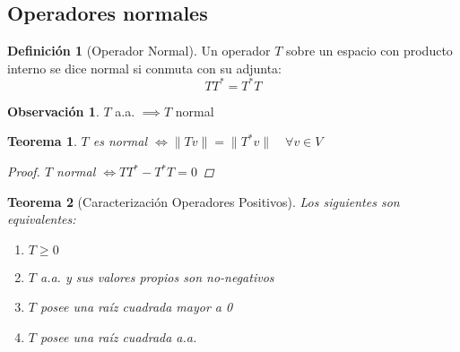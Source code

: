 \documentclass[11pt]{book}
\newtheorem{thm}{Teorema}[section]
\theoremstyle{definition}
\newtheorem{defn}{Definición}[section]
\newtheorem{obs}{Observación}[section]
\begin{document}
\subsection{Operadores normales}
\begin{defn}[Operador Normal]
	Un operador $T$ sobre un espacio con producto interno se dice normal si conmuta con su adjunta:
	\[TT^*=T^*T\]
\end{defn}
\begin{obs}
	$T$ a.a. $\implies T$ normal
\end{obs}
\begin{thm}
	$T$ es normal $\iff\|Tv\|=\|T^*v\|\quad \forall v\in V$
	\begin{proof}
		$T$ normal $\iff TT^*-T^*T=0$
	\end{proof}
\end{thm}
\begin{thm}[Caracterización Operadores Positivos]
	Los siguientes son equivalentes:
	\begin{enumerate}[label=\alph*)]
		\item $T\geq 0$

		\item $T$ a.a. y sus valores propios son no-negativos

		\item $T$ posee una raíz cuadrada mayor a 0

		\item $T$ posee una raíz cuadrada a.a.


\end{enumerate}
\end{thm}
\end{document}
